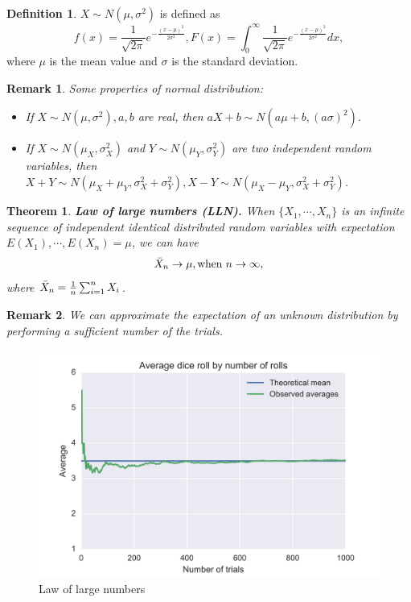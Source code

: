 \documentclass[a4paper]{article}
\theoremstyle{definition}
\newtheorem{definition}{Definition}
\theoremstyle{plain}
\newtheorem{theorem}{Theorem}
\newtheorem{remark}{Remark}
\begin{document}
\begin{definition}
 $X\sim N(\mu,\sigma^2)$ is defined as 
\begin{equation*}
     f(x)=\frac{1}{\sqrt{2\pi}}e^{-\frac{(x-\mu)^2}{2\sigma^2}}, F(x)=\int_0^\infty\frac{1}{\sqrt{2\pi}}e^{-\frac{(x-\mu)^2}{2\sigma^2}}dx,
 \end{equation*}
 where $\mu$ is the mean value and $\sigma$ is the standard deviation.
\end{definition}

\begin{remark}
Some properties of normal distribution:
\begin{itemize}
    \item If $X\sim N(\mu,\sigma^2), a, b$ are real, then $aX+b\sim N(a\mu+b,(a\sigma)^2)$.
    \item If $X\sim N(\mu_X,\sigma_X^2)$ and $Y\sim N(\mu_Y,\sigma_Y^2)$ are two independent random variables, then $ X+Y \sim N(\mu_X + \mu_Y, \sigma^2_X + \sigma^2_Y), {\displaystyle X-Y\sim N(\mu _{X}-\mu _{Y},\sigma _{X}^{2}+\sigma _{Y}^{2})}$.
\end{itemize}
\end{remark}

\begin{theorem}
\textbf{Law of large numbers (LLN).} When $\{X_1,\cdots,X_n\}$ is an infinite sequence of independent identical distributed random variables with expectation $E(X_1),\cdots,E(X_n)=\mu$, we can have
\begin{equation*}
    \Bar{X}_n\rightarrow\mu, \text{when }n\rightarrow\infty,
\end{equation*}
where $\Bar{X}_n=\frac{1}{n}\sum^n_{i=1} X_i$.
\end{theorem}

\begin{remark}
We can approximate the expectation of an unknown distribution by performing a sufficient number of the trials.
\end{remark}

\begin{figure}[H]
    \centering
    \includegraphics[scale=0.15]{figure/1920px-Lawoflargenumbers.svg.png}
    \caption{Law of large numbers}
\end{figure}
\end{document}
